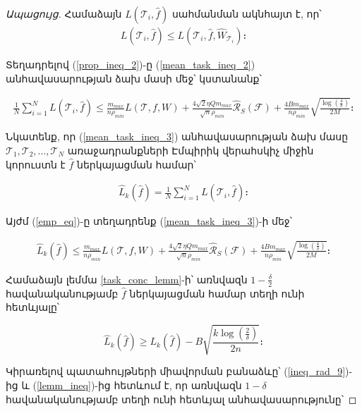 \documentclass[12pt]{article}
\begin{document}
\begin{proof}[Ապացույց]
\noindent Համաձայն $L(\mathcal{T}_i, \hat{f})$ սահմանման ակնհայտ է, որ՝
\begin{align}
\label{prop_ineq_2}
L(\mathcal{T}_i, \hat{f}) \leq L(\mathcal{T}_i, \hat{f}, \hat{W}_{\mathcal{T}_i})։
\end{align}

\noindent Տեղադրելով  (\ref{prop_ineq_2})-ը  (\ref{mean_task_ineq_2}) անհավասարության ձախ մասի մեջ՝ կստանանք՝

\begin{align}
\label{mean_task_ineq_3}
\frac{1}{N}\sum_{i=1}^N L(\mathcal{T}_i,\hat{f}) \leq  \frac{m_{max}}{n \rho_{min}}  L(\mathcal{T},f, W) +
\frac{4\sqrt{2} \eta Qm_{max}}{\sqrt{n}\rho_{min}} \hat{\mathcal{R}}_S(\mathcal{F})+    \frac{4Bm_{max}}{n\rho_{min}}\sqrt{\frac{\log \left( \frac{4}{\delta} \right)}{2M}}։
\end{align}



Նկատենք, որ (\ref{mean_task_ineq_3}) անհավասարության ձախ մասը $\mathcal{T}_1,\mathcal{T}_2, ...,\mathcal{T}_N$ առաջադրանքների Էմպիրիկ վերահսկիչ միջին կորուստն է $\hat{f}$ ներկայացման համար՝


\begin{align}
\label{emp_eq}
\hat{L}_k(\hat{f}) = \frac{1}{N}\sum_{i=1}^NL(\mathcal{T}_i, \hat{f})։
\end{align}

Այժմ (\ref{emp_eq})-ը տեղադրենք (\ref{mean_task_ineq_3})-ի մեջ՝
 
\begin{align}
\label{ineq_rad_9}
\hat{L}_k(\hat{f}) \leq    \frac{m_{max}}{n \rho_{min}}  L(\mathcal{T}, f, W) +
\frac{4 \sqrt{2} \eta Qm_{max}}{\sqrt{n}\rho_{min}} \hat{\mathcal{R}}_S(\mathcal{F})+    \frac{4Bm_{max}}{n\rho_{min}}\sqrt{\frac{\log \left( \frac{4}{\delta} \right)}{2M}}։
\end{align}

Համաձայն լեմմա \ref{task_conc_lemm}-ի՝ առնվազն $1-\frac{\delta}{2}$ հավանականությամբ $\hat{f}$ ներկայացման համար տեղի ունի հետևյալը՝


\begin{equation}
\label{lemm_ineq}
\hat{L}_k(\hat{f}) \geq L_k(\hat{f}) - B\sqrt{\frac{k\log \left(\frac{2}{\delta}\right) }{2n}}։
\end{equation}



Կիրառելով պատահույթների միավորման բանաձևը՝ (\ref{ineq_rad_9})-ից  և (\ref{lemm_ineq})-ից  հետևում է, որ առնվազն $1-\delta$ հավանականությամբ տեղի ունի հետևյալ անհավասարությունը՝


\end{proof}
\end{document}
